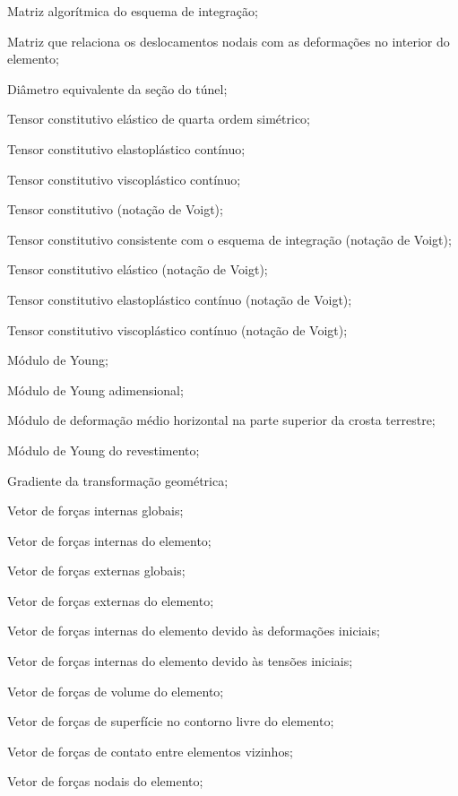 \item[\textbf{Latino maiúsculo:}]
\item[$\All$]	Matriz algorítmica do esquema de integração;
\item[$\Bll$]	Matriz que relaciona os deslocamentos nodais com as deformações no interior do elemento;
\item[$D$]				Diâmetro equivalente da seção do túnel;
\item[$\Dllll$] Tensor constitutivo elástico de quarta ordem simétrico;
\item[$\Dllll^{ep}$] Tensor constitutivo elastoplástico contínuo;
\item[$\Dllll^{vp}$] Tensor constitutivo viscoplástico contínuo;
\item[$\Dll$] Tensor constitutivo (notação de Voigt);
\item[$\Dll^{alg}$] Tensor constitutivo consistente com o esquema de integração (notação de Voigt);
\item[$\Dll^{e}$] Tensor constitutivo elástico (notação de Voigt);
\item[$\Dll^{ep}$] Tensor constitutivo elastoplástico contínuo (notação de Voigt);
\item[$\Dll^{vp}$] Tensor constitutivo viscoplástico contínuo (notação de Voigt);
\item[$E$]				Módulo de Young;
\item[$E^*$]			Módulo de Young adimensional;
\item[$E_h$]			Módulo de deformação médio horizontal na parte superior da crosta terrestre;
\item[$E_{rev}$]			Módulo de Young do revestimento;
\item[$\Fll$]			Gradiente da transformação geométrica;
\item[$\Fl_{int}$]			Vetor de forças internas globais;
\item[$\Fl_{int_e}$]			Vetor de forças internas do elemento;
\item[$\Fl_{ext}$]			Vetor de forças externas globais;
\item[$\Fl_{ext_e}$]			Vetor de forças externas do elemento;
\item[$\Fl_{\varepsilon_{I_e}}$]	Vetor de forças internas do elemento devido às deformações iniciais;
\item[$\Fl_{\sigma_{I_e}}$]	Vetor de forças internas do elemento devido às tensões iniciais;
\item[$\Fl_{V_e}$]	Vetor de forças de volume do elemento;
\item[$\Fl_{S_e}$]	Vetor de forças de superfície no contorno livre do elemento;
\item[$\Fl_{C_e}$]	Vetor de forças de contato entre elementos vizinhos;
\item[$\Fl_{N_e}$]	Vetor de forças nodais do elemento;

